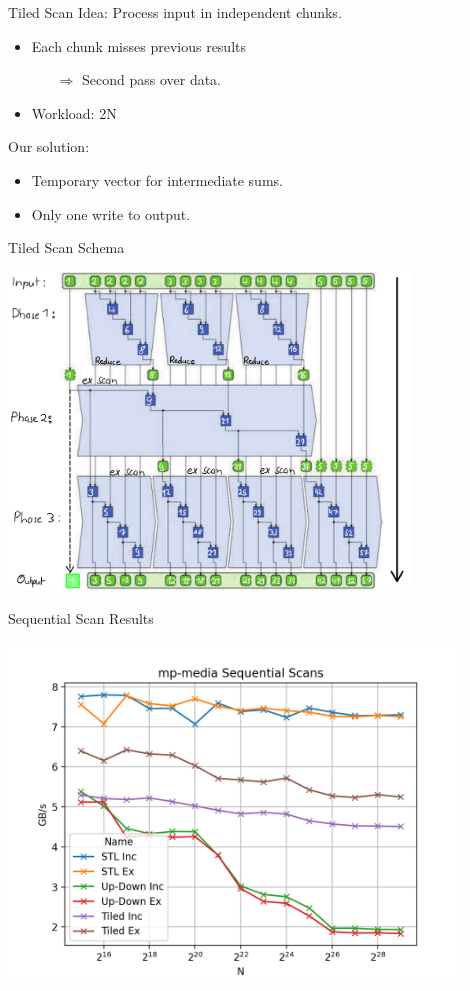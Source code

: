\begin{frame}{Tiled Scan} 
Idea: Process input in independent chunks.
\begin{itemize}
 \item Each chunk misses previous results
 \begin{itemize}
 \item[$\Rightarrow$] Second pass over data.
 \end{itemize}
 \item Workload: 2N
\end{itemize}
\vspace{10pt}
Our solution:
\begin{itemize}
 \item Temporary vector for intermediate sums.
 \item Only one write to output.
\end{itemize}

\end{frame} 

\begin{frame}{Tiled Scan Schema}
 
  \centering
  \includegraphics[width=0.80\textwidth]{"wiki/3Phase Nice"}
 
\end{frame}

\begin{frame}{Sequential Scan Results}
 
  \centering
  \vspace{-5pt}
  \includegraphics[width=0.90\textwidth]{"graphs/mp-media Sequential Scans"}
 
\end{frame}
